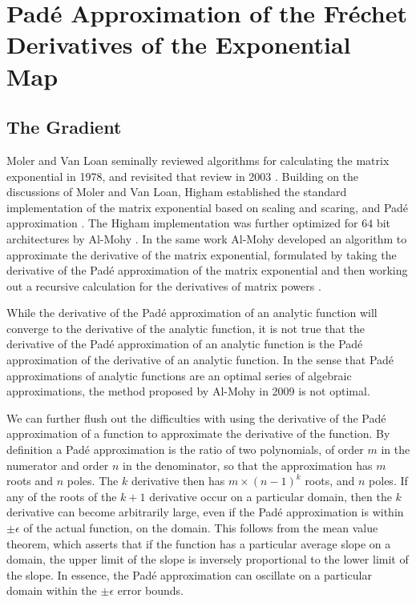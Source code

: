 \chapter{Pad\'{e} Approximation of the Fr\'{e}chet Derivatives of the Exponential Map}
\section{The Gradient}
Moler and Van Loan seminally reviewed algorithms for calculating the matrix exponential in
1978, and revisited that review in 2003 \cite{moler_nineteen_1978,moler_nineteen_2003}. 
Building on the discussions of Moler and Van Loan, Higham established the standard 
implementation of the matrix exponential based on scaling and scaring, and Pad\'{e} 
approximation \cite{higham_scaling_2005,higham_functions_2008}. The Higham implementation was
further optimized for $64$ bit architectures by Al-Mohy \cite{al-mohy_new_2009}. In the same
work Al-Mohy developed an algorithm to approximate the derivative of the matrix exponential, 
formulated by taking the derivative of the Pad\'{e} approximation of the matrix exponential 
and then working out a recursive calculation for the derivatives of matrix 
powers \cite{al-mohy_computing_2009}.

While the derivative of the Pad\'{e} approximation of an analytic function will converge to 
the derivative of the analytic function, it is not true that the derivative of the Pad\'{e} 
approximation of an analytic function is the Pad\'{e} approximation of the derivative of an 
analytic function. In the sense that Pad\'{e} approximations of analytic functions are an 
optimal series of algebraic approximations, the method proposed by Al-Mohy in 2009 is not 
optimal.

We can further flush out the difficulties with using the derivative of the Pad\'{e} 
approximation of a function to approximate the derivative of the function. By definition
a Pad\'{e} approximation is the ratio of two polynomials, of order $m$ in the numerator
and order $n$ in the denominator, so that the approximation has $m$ roots and $n$ poles. The
$k$ derivative then has $m \times \left(n-1\right)^k$ roots, and $n$ poles. If  any of the 
roots of the $k+1$ derivative occur on a particular domain, then the $k$ derivative can 
become arbitrarily large, even if the Pad\'{e} approximation is within $\pm\epsilon$ of the 
actual function, on the domain. This follows from the mean value theorem, which asserts that 
if the function has a particular average slope on a domain, the upper limit of the slope is 
inversely proportional to the lower limit of the slope. In essence, the Pad\'{e} 
approximation can oscillate on a particular domain within the $\pm\epsilon$ error bounds.

